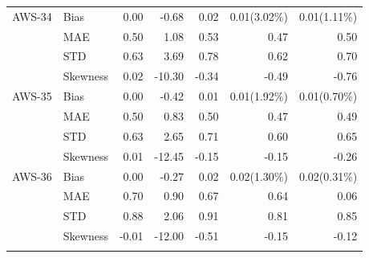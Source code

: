 \documentclass[amt, manuscript]{copernicus}
\begin{document}
\begin{table}[t]
\begin{tabular}{llrr|rrr}
		\middlehline
AWS-34	  &Bias    &    0.00 &         -0.68 &            0.02 &                0.01(3.02\%)& 0.01(1.11\%) \\
		  &MAE      &    0.50 &          1.08 &            0.53 &                 0.47 		 & 0.50\\
		  &STD      &    0.63 &          3.69 &            0.78 &                 0.62 		 & 0.70\\
		  &Skewness &    0.02 &        -10.30 &           -0.34 &                -0.49 		 &-0.76	\\
		 \middlehline
AWS-35	 & Bias     &    0.00 &         -0.42 &            0.01 &                 0.01(1.92\%) & 0.01(0.70\%) \\
		 &MAE       &    0.50 &          0.83 &            0.50 &                 0.47 		   & 0.49\\
		 &STD       &    0.63 &          2.65 &            0.71 &                 0.60         & 0.65\\
		 &Skewness  &    0.01 &        -12.45 &           -0.15 &                -0.15         &-0.26\\
		 \middlehline
AWS-36   &Bias     &    0.00 &         -0.27 &            0.02 &                 0.02(1.30\%) & 0.02(0.31\%)\\
		 &MAE      &    0.70 &          0.90 &            0.67 &                 0.64 		  & 0.06\\
		 &STD      &    0.88 &          2.06 &            0.91 &                 0.81 		  &0.85\\
		 &Skewness &   -0.01 &        -12.00 &           -0.51 &                -0.15 		  &-0.12\\	 
		\bottomhline				
	\end{tabular}
	\belowtable{} %
\end{table}
\end{document}
